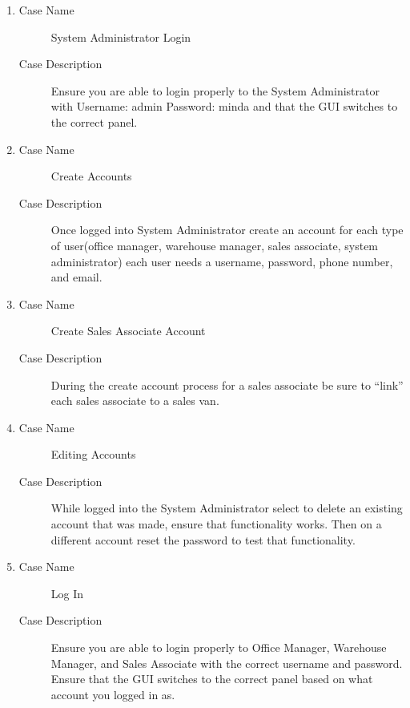 \documentclass{report}
\begin{document}
\begin{enumerate}
  \item \begin{description}
          \item [Case Name] System Administrator Login
          \item [Case Description] Ensure you are able to login properly to the System Administrator with Username: admin Password: minda and that the GUI switches to the correct panel.
        \end{description}
  \item \begin{description}
          \item [Case Name] Create Accounts
          \item [Case Description] Once logged into System Administrator create an account for each type of user(office manager, warehouse manager, sales associate, system administrator)  each user needs a username, password, phone number, and email.
        \end{description}
  \item \begin{description}
          \item [Case Name] Create Sales Associate Account
          \item [Case Description] During the create account process for a sales associate be sure to “link” each sales associate to a sales van.
        \end{description}
  \item \begin{description}
          \item [Case Name] Editing Accounts
          \item [Case Description] While logged into the System Administrator select to delete an existing account that was made, ensure that functionality works. Then on a different account reset the password to test that functionality.
        \end{description}
  \item \begin{description}
          \item [Case Name] Log In
          \item [Case Description] Ensure you are able to login properly to Office Manager, Warehouse Manager, and Sales Associate with the correct username and password. Ensure that the GUI switches to the correct panel based on what account you logged in as.
        \end{description}

\end{enumerate}
\end{document}
